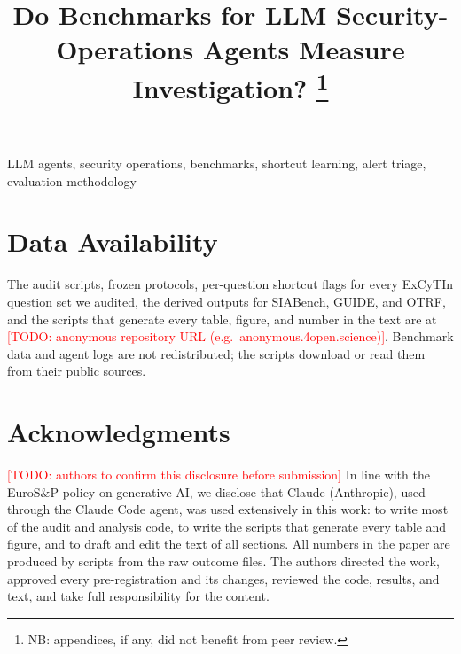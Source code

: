 \documentclass[compsoc,conference,a4paper,10pt,times]{IEEEtran}
\newcommand{\todo}[1]{\textcolor{red}{[TODO: #1]}}
\newcommand{\repourl}{\todo{anonymous repository URL (e.g.\ anonymous.4open.science)}}
\begin{document}
\title{Do Benchmarks for LLM Security-Operations Agents Measure Investigation?
\thanks{NB: appendices, if any, did not benefit from peer review.}}

\author{}

\maketitle



\begin{IEEEkeywords}
LLM agents, security operations, benchmarks, shortcut learning, alert triage, evaluation methodology
\end{IEEEkeywords}












\section*{Data Availability}
The audit scripts, frozen protocols, per-question shortcut flags for every ExCyTIn question set we audited, the derived outputs for SIABench, GUIDE, and OTRF, and the scripts that generate every table, figure, and number in the text are at \repourl{}. Benchmark data and agent logs are not redistributed; the scripts download or read them from their public sources.

\section*{Acknowledgments}
\todo{authors to confirm this disclosure before submission} In line with the EuroS\&P policy on generative AI, we disclose that Claude (Anthropic), used through the Claude Code agent, was used extensively in this work: to write most of the audit and analysis code, to write the scripts that generate every table and figure, and to draft and edit the text of all sections. All numbers in the paper are produced by scripts from the raw outcome files. The authors directed the work, approved every pre-registration and its changes, reviewed the code, results, and text, and take full responsibility for the content.

{\footnotesize

}

\appendices

\end{document}

